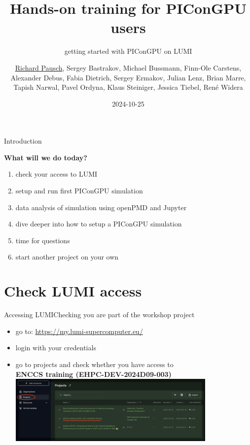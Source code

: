 \documentclass[
  aspectratio=169,
  10pt
]{beamer}
\title[]{Hands-on training for PIConGPU users}
\subtitle{getting started with PIConGPU on LUMI} %
\author[R. Pausch, et al.]{\uline{Richard Pausch}\inst{1}, Sergey Bastrakov\inst{1}, Michael Bussmann\inst{1,2}, Finn-Ole Carstens\inst{1}, Alexander Debus\inst{1}, Fabia Dietrich\inst{1}, Sergey Ermakov\inst{1,3}, Julian Lenz\inst{1,2}, Brian Marre\inst{1}, Tapish Narwal\inst{1,2}, Pavel Ordyna\inst{1}, Klaus Steiniger\inst{1,2}, Jessica Tiebel\inst{1}, René Widera\inst{1}}
\date[2024-10-25]{{2024-10-25}} %
\institute[
]{%
    \inst{1}Helmholtz-Zentrum Dresden -- Rossendorf \\[1ex]
    \inst{2}CASUS - Center for Advanced Systems Understanding \\[1ex]%
    \inst{3}ETH Zürich
}
\begin{document}
\frame{\titlepage}

\begin{frame}[t,fragile]{Introduction}

\Large  \textbf{What will we do today? }
  {\Large
  \begin{enumerate}
      \item check your access to LUMI
      \item setup and run first PIConGPU simulation
      \item data analysis of simulation using openPMD and Jupyter
      \item dive deeper into how to setup a PIConGPU simulation
      \item time for questions
      \item start another project on your own
  \end{enumerate}
}
  
\end{frame}

\part{Check LUMI access}
\frame{\partpage}

\begin{frame}{Accessing LUMI}{Checking you are part of the workshop project}
\begin{itemize}
    \item go to: \url{https://my.lumi-supercomputer.eu/}
    \item login with your credentials
    \item go to projects and check whether you have access to\\ 
    \textbf{ENCCS training (EHPC-DEV-2024D09-003)}\\
    \includegraphics[width=0.8\textwidth]{images/LUMI_projects.png}
\end{itemize}

\end{frame}
\end{document}
